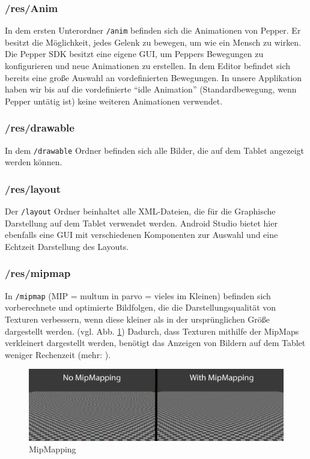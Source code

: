 \subsubsection*{/res/Anim}
In dem ersten Unterordner \verb|/anim| befinden sich die Animationen von Pepper. Er besitzt die Möglichkeit, jedes Gelenk zu bewegen, um wie ein Mensch zu wirken. Die Pepper SDK besitzt eine eigene GUI, um Peppers Bewegungen zu konfigurieren und neue Animationen zu erstellen. In dem Editor befindet sich bereits eine große Auswahl an vordefinierten Bewegungen. In unsere Applikation haben wir bis auf die vordefinierte 
``idle Animation''  (Standardbewegung, wenn Pepper untätig ist) keine weiteren Animationen verwendet. \\

\subsubsection*{/res/drawable}
In dem \verb|/drawable| Ordner befinden sich alle Bilder, die auf dem Tablet angezeigt werden können.\\

\subsubsection*{/res/layout}
Der \verb|/layout| Ordner beinhaltet alle XML-Dateien, die für die Graphische Darstellung auf dem Tablet verwendet werden. Android 
Studio bietet hier ebenfalls eine GUI mit verschiedenen Komponenten zur Auswahl und eine Echtzeit Darstellung des Layouts. \\

\subsubsection*{/res/mipmap}
In \verb|/mipmap| (MIP = multum in parvo = vieles im Kleinen) befinden sich vorberechnete und optimierte Bildfolgen, die die Darstellungsqualität von Texturen verbessern, wenn diese kleiner als in der ursprünglichen Größe dargestellt werden. (vgl. Abb. \ref{fig:MipMap}) Dadurch, dass Texturen mithilfe der MipMaps verkleinert dargestellt werden, benötigt das Anzeigen von Bildern auf dem Tablet weniger Rechenzeit (mehr: \cite{MipMaps}).\\

\begin{figure}[H]
    \includegraphics[width=\textwidth]{Figures/AppChapter/4_1_2.png}
    \caption{MipMapping \cite{mimappng}}
    \label{fig:MipMap}
    \centering
\end{figure}

